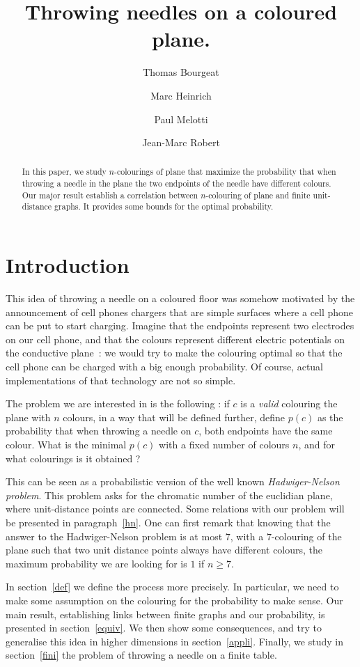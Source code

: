 \documentclass[a4paper,11pt]{article}
\title{Throwing needles on a coloured plane.}
\author{Thomas Bourgeat \and Marc Heinrich \and Paul Melotti 
\and Jean-Marc Robert}
\theoremstyle{definition}
\theoremstyle{remark}
\begin{document}
\maketitle

\begin{abstract}  In this paper, we study $n$-colourings of plane 
that maximize the probability that when throwing a needle in the plane the two 
endpoints of the needle have different colours. Our major result establish a 
correlation between $n$-colouring of plane and finite unit-distance graphs. 
It provides some bounds for the optimal probability.\end{abstract}

\section{Introduction}
This idea of throwing a needle on a coloured floor was somehow motivated by 
the announcement of cell phones chargers that are simple surfaces where a cell 
phone can be put to start charging. Imagine that the endpoints 
represent two electrodes on our cell phone, and that the colours represent 
different electric potentials on the conductive plane~: we would try to make 
the colouring optimal so that the cell phone can be charged with a big enough 
probability. Of course, actual implementations of that technology are not so 
simple.

The problem we are interested in is the following : if $c$ is a 
\emph{valid} colouring the plane with $n$ colours, in a  way that will be 
defined further, define $p(c)$ as the probability that when throwing a needle 
on $c$, both endpoints have the same colour. What is the minimal $p(c)$ with a 
fixed number of colours $n$, and for what colourings is it obtained ?

This can be seen as a probabilistic version of the well known 
\emph{Hadwiger-Nelson problem}. This problem asks for the chromatic number 
of the euclidian plane, where unit-distance points are connected. Some 
relations with our problem will be presented in paragraph~\ref{hn}. One can 
first remark that knowing that the answer to the Hadwiger-Nelson problem is at 
most $7$, with a $7$-colouring of the plane such that two unit distance points 
always have different colours, the maximum probability we are looking for is 
$1$ if $n \geq 7$.

In section~\ref{def} we define the process more precisely. In particular, we 
need to make some assumption on the colouring for the probability to make 
sense. Our main result, establishing links between finite graphs and our 
probability, is presented in section~\ref{equiv}. We then show some 
consequences, and try to generalise this idea in higher dimensions in
section~\ref{appli}. Finally, we study in section~\ref{fini} the problem of 
throwing a needle on a finite table.
\end{document}

